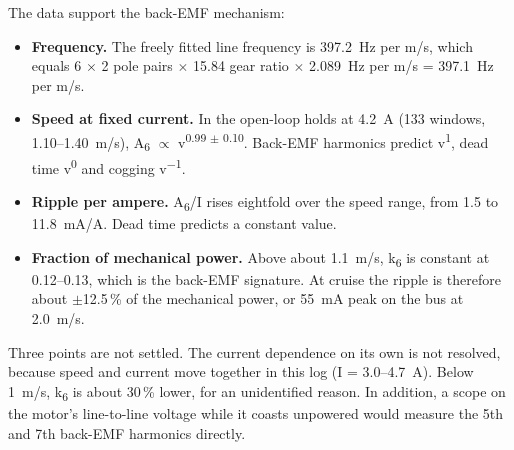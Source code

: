 \documentclass[10pt]{article}
\begin{document}
The data support the back-EMF mechanism:
\begin{itemize}\setlength{\itemsep}{0pt}
\item \textbf{Frequency.} The freely fitted line frequency is 397.2~Hz per m/s, which equals
6 $\times$ 2 pole pairs $\times$ 15.84 gear ratio $\times$ 2.089~Hz per m/s = 397.1~Hz per m/s.
\item \textbf{Speed at fixed current.} In the open-loop holds at 4.2~A (133 windows,
1.10--1.40~m/s), A\textsubscript{6} $\propto$ v\textsuperscript{0.99 $\pm$ 0.10}. Back-EMF
harmonics predict v\textsuperscript{1}, dead time v\textsuperscript{0} and cogging
v\textsuperscript{$-$1}.
\item \textbf{Ripple per ampere.} A\textsubscript{6}/I rises eightfold over the speed range, from
1.5 to 11.8~mA/A. Dead time predicts a constant value.
\item \textbf{Fraction of mechanical power.} Above about 1.1~m/s, k\textsubscript{6} is constant
at 0.12--0.13, which is the back-EMF signature. At cruise the ripple is therefore about
$\pm$12.5\,\% of the mechanical power, or 55~mA peak on the bus at 2.0~m/s.
\end{itemize}

Three points are not settled. The current dependence on its own is not resolved, because speed and
current move together in this log (I = 3.0--4.7~A). Below 1~m/s, k\textsubscript{6} is about
30\,\% lower, for an unidentified reason. In addition, a scope on the motor's line-to-line voltage
while it coasts unpowered would measure the 5th and 7th back-EMF harmonics directly.
\end{document}
